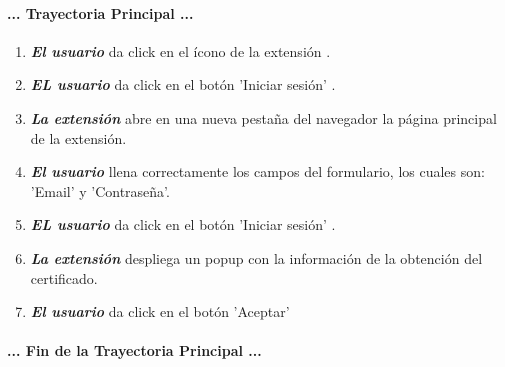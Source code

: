 \documentclass[12pt, a4paper, titlepage]{report}
\newcommand*{\img}[1]{%
    \raisebox{-.3\baselineskip}{%
        \texttt{[image: \#1]}%
    }%
}
\begin{document}
				\paragraph{... Trayectoria Principal ...}
				\begin{enumerate}
					
					\item \textbf{\textit{El usuario}} da click en el ícono de la extensión \img{imagenes/Disenio/Componente_1/UI_icon_escom.png}.
					
					\item \textbf{\textit{EL usuario}} da click en el botón 'Iniciar sesión' \img{imagenes/Disenio/Componente_1/UI_btn_login.png}.
					
					\item \textbf{\textit{La extensión}} abre en una nueva pestaña del navegador la página principal de la extensión.
					
					\item \textbf{\textit{El usuario}} llena correctamente los campos del formulario, los cuales son: 'Email' y 'Contraseña'.
					
					\item \textbf{\textit{EL usuario}} da click en el botón 'Iniciar sesión' \img{imagenes/Disenio/Componente_1/UI_btn_login.png}.
					
					\item \textbf{\textit{La extensión}} despliega un popup con la información de la obtención del certificado.
					
					\item \textbf{\textit{El usuario}} da click en el botón 'Aceptar' \img{imagenes/Disenio/Componente_1/UI_btn_accept.png}
				
				\end{enumerate}
				\paragraph{... Fin de la Trayectoria Principal ...}
				
				
\end{document}
